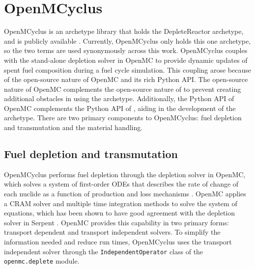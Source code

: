 \section{OpenMCyclus}\label{sec:openmcyclus}
OpenMCyclus is an archetype library that holds the DepleteReactor 
archetype, and is publicly available \cite{bachmann_openmcyclus_2023}. 
Currently, OpenMCyclus only holds this one archetype, so 
the two terms are used synonymously across this work. OpenMCyclus couples 
\Cyclus with the stand-alone depletion solver in OpenMC 
\cite{romano_depletion_2021} to provide 
dynamic updates of spent fuel composition during a fuel cycle simulation.
This coupling arose because 
of the open-source nature of OpenMC and its rich Python \gls{API}. 
The open-source nature of OpenMC complements the open-source nature 
of \Cyclus to prevent creating additional obstacles in using the archetype. 
Additionally, the Python \gls{API} of OpenMC complements the Python 
\gls{API} of \Cyclus, aiding in the development of the archetype. 
There are two primary components to OpenMCyclus: fuel depletion and 
transmutation and the material handling. 

\subsection{Fuel depletion and transmutation} \label{sec:transmute}
OpenMCyclus performs fuel depletion through  
the depletion solver in OpenMC, which solves a system 
of first-order ODEs that describes 
the rate of change of each nuclide as a function of production and loss 
mechanisms \cite{romano_depletion_2021}. OpenMC applies a \gls{CRAM} solver 
and multiple time integration methods to solve the system of equations, which 
has been shown to have good agreement with the depletion solver in Serpent 
\cite{romano_depletion_2021}. OpenMC provides this capability in two primary 
forms: transport dependent and transport independent solvers. To simplify 
the information needed and reduce run times, OpenMCyclus uses the transport 
independent solver through the \texttt{IndependentOperator} class of the 
\texttt{openmc.deplete} module. 

